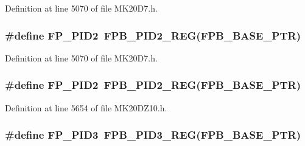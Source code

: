 Definition at line 5070 of file M\+K20\+D7.\+h.

\subsubsection[{\texorpdfstring{F\+P\+\_\+\+P\+I\+D2}{FP_PID2}}]{\setlength{\rightskip}{0pt plus 5cm}\#define F\+P\+\_\+\+P\+I\+D2~{\bf F\+P\+B\+\_\+\+P\+I\+D2\+\_\+\+R\+EG}({\bf F\+P\+B\+\_\+\+B\+A\+S\+E\+\_\+\+P\+TR})}\hypertarget{group___f_p_b___register___accessor___macros_gaa858bde712d7ddaf74a6e62c51bed1f9}{}\label{group___f_p_b___register___accessor___macros_gaa858bde712d7ddaf74a6e62c51bed1f9}


Definition at line 5070 of file M\+K20\+D7.\+h.

\subsubsection[{\texorpdfstring{F\+P\+\_\+\+P\+I\+D2}{FP_PID2}}]{\setlength{\rightskip}{0pt plus 5cm}\#define F\+P\+\_\+\+P\+I\+D2~{\bf F\+P\+B\+\_\+\+P\+I\+D2\+\_\+\+R\+EG}({\bf F\+P\+B\+\_\+\+B\+A\+S\+E\+\_\+\+P\+TR})}\hypertarget{group___f_p_b___register___accessor___macros_gaa858bde712d7ddaf74a6e62c51bed1f9}{}\label{group___f_p_b___register___accessor___macros_gaa858bde712d7ddaf74a6e62c51bed1f9}


Definition at line 5654 of file M\+K20\+D\+Z10.\+h.

\subsubsection[{\texorpdfstring{F\+P\+\_\+\+P\+I\+D3}{FP_PID3}}]{\setlength{\rightskip}{0pt plus 5cm}\#define F\+P\+\_\+\+P\+I\+D3~{\bf F\+P\+B\+\_\+\+P\+I\+D3\+\_\+\+R\+EG}({\bf F\+P\+B\+\_\+\+B\+A\+S\+E\+\_\+\+P\+TR})}\hypertarget{group___f_p_b___register___accessor___macros_ga00e216d1c7ecd27c93d111244f266a1a}{}\label{group___f_p_b___register___accessor___macros_ga00e216d1c7ecd27c93d111244f266a1a}


